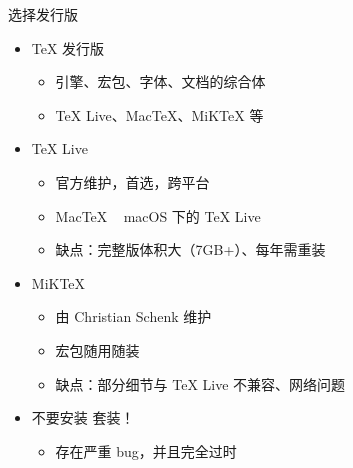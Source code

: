 \begin{frame}{选择发行版}
    \begin{itemize}
        \item<+-> \TeX{} 发行版
              \begin{itemize}
                  \item 引擎、宏包、字体、文档的综合体
                  \item \TeX{} Live、Mac\TeX{}、MiK\TeX{} 等
              \end{itemize}
        \item<+-> \TeX{} Live 
              \begin{itemize}
                  \item 官方维护，首选，跨平台
                  \item Mac\TeX{} ~ macOS 下的 \TeX{} Live
                  \item 缺点：完整版体积大（7GB+）、每年需重装
              \end{itemize}
        \item<+-> MiK\TeX{} 
              \begin{itemize}
                  \item 由 Christian Schenk 维护
                  \item 宏包随用随装
                  \item 缺点：部分细节与 \TeX{} Live 不兼容、网络问题
              \end{itemize}
        \item<+-> 不要安装 \CTeX{} 套装！
              \begin{itemize}
                  \item 存在严重 bug，并且完全过时
              \end{itemize}
    \end{itemize}
\end{frame}